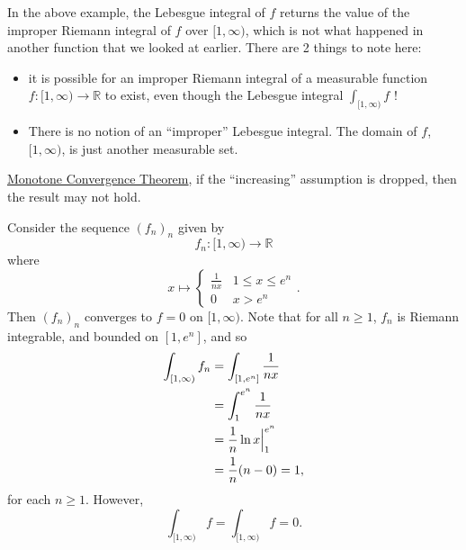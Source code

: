 \documentclass[notoc,notitlepage]{tufte-book}
\begin{document}
\begin{note}
  In the above example, the Lebesgue integral of $f$ returns the value of the
  improper Riemann integral of $f$ over $[1, \infty)$, which is not what
  happened in another function that we looked at earlier. There are 2 things to
  note here:
  \begin{itemize}
    \item it is possible for an improper Riemann integral of a measurable
      function $f : [1, \infty) \to \mathbb{R}$ to exist, even though the
      Lebesgue integral $\int_{[1, \infty)} f$ !
    \item There is no notion of an ``improper'' Lebesgue integral. The domain of
      $f$, $[1, \infty)$, is just another measurable set.
  \end{itemize}
\end{note}

 \hyperref[thm:the_monotone_convergence_theorem]{Monotone
Convergence Theorem},  if the ``increasing'' assumption is dropped, then the
result may not hold.

\begin{eg}
  Consider the sequence $(f_n)_n$ given by
  \begin{equation*}
    f_n : [1, \infty) \to \mathbb{R}
  \end{equation*}
  where
  \begin{equation*}
    x \mapsto \begin{cases}
      \frac{1}{nx} & 1 \leq x \leq e^n \\
      0            & x > e^n
    \end{cases}.
  \end{equation*}
  Then $(f_n)_n$ converges  to $f = 0$ on $[1, \infty)$. Note
  that for all $n \geq 1$, $f_n$ is Riemann integrable, and bounded on $[1,
  e^n]$, and so
  \begin{align*}
    \int_{[1, \infty)} f_n &= \int_{[1, e^n]} \frac{1}{nx} \\
                           &= \int_{1}^{e^n} \frac{1}{nx} \\
                           &= \frac{1}{n} \ln x \Big|_{1}^{e^n} \\
                           &= \frac{1}{n} (n-0) = 1,
  \end{align*}
  for each $n \geq 1$. However,
  \begin{equation*}
    \int_{[1, \infty)} f = \int_{[1, \infty)} f = 0.
  \end{equation*}
\end{eg}
\end{document}
